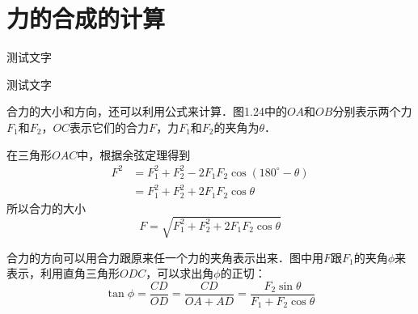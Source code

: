 \section{力的合成的计算}
\begin{Point*}
	测试文字
\end{Point*}

\begin{Case*}
	\item 测试文字
\end{Case*}
合力的大小和方向，还可以利用公式来计算．图1.24中的$OA$和$OB$分别表示两个力$F_1$和$F_2$，$OC$表示它们的合力$F$，力$F_1$和$F_2$的夹角为$\theta$．
\begin{figure}[H]
    \centering
    \caption{}
\end{figure}

在三角形$OAC$中，根据余弦定理得到
\begin{equation*}
    \begin{aligned}
        F^2 & =F_{1}^{2}+F_{2}^{2}-2F_1F_2\cos \left( 180^\circ -\theta \right) \\
            & =F_{1}^{2}+F_{2}^{2}+2F_1F_2\cos \theta
    \end{aligned}
\end{equation*}
所以合力的大小
\begin{equation}
    F=\sqrt{F_1^2+F_2^2+2F_1F_2\cos\theta}
\end{equation}

合力的方向可以用合力跟原来任一个力的夹角表示出来．图中用$F$跟$F_1$的夹角$\phi$来表示，利用直角三角形$ODC$，可以求出角$\phi$的正切：
\begin{equation}
    \tan\phi =\frac{CD}{OD}=\frac{CD}{OA+AD}=\frac{F_2\sin \theta }{F_1+F_2\cos\theta}
\end{equation}


